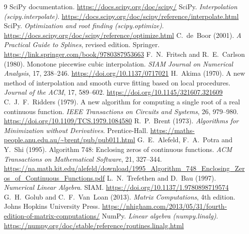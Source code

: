 \documentclass[11pt,a4paper]{article}
\begin{document}
\begin{thebibliography}{9}
   SciPy documentation. \url{https://docs.scipy.org/doc/scipy/}
   SciPy. \emph{Interpolation (scipy.interpolate)}.
    \url{https://docs.scipy.org/doc/scipy/reference/interpolate.html}
   SciPy. \emph{Optimization and root finding
    (scipy.optimize)}.
    \url{https://docs.scipy.org/doc/scipy/reference/optimize.html}
   C.~de~Boor (2001). \emph{A Practical Guide to Splines},
    revised edition. Springer.
    \url{https://link.springer.com/book/9780387953663}
   F.~N.~Fritsch and R.~E.~Carlson (1980). Monotone
    piecewise cubic interpolation. \emph{SIAM Journal on Numerical
    Analysis}, 17, 238--246. \url{https://doi.org/10.1137/0717021}
   H.~Akima (1970). A new method of interpolation and smooth
    curve fitting based on local procedures. \emph{Journal of the ACM}, 17,
    589--602. \url{https://doi.org/10.1145/321607.321609}
   C.~J.~F.~Ridders (1979). A new algorithm for computing a
    single root of a real continuous function. \emph{IEEE Transactions on
    Circuits and Systems}, 26, 979--980.
    \url{https://doi.org/10.1109/TCS.1979.1084580}
   R.~P.~Brent (1973). \emph{Algorithms for Minimization
    without Derivatives}. Prentice-Hall.
    \url{https://maths-people.anu.edu.au/~brent/pub/pub011.html}
   G.~E.~Alefeld, F.~A.~Potra and Y.~Shi (1995). Algorithm
    748: Enclosing zeros of continuous functions. \emph{ACM Transactions on
    Mathematical Software}, 21, 327--344.
    \url{https://na.math.kit.edu/alefeld/download/1995_Algorithm_748_Enclosing_Zeros_of_Continuous_Functions.pdf}
   L.~N.~Trefethen and D.~Bau (1997). \emph{Numerical
    Linear Algebra}. SIAM. \url{https://doi.org/10.1137/1.9780898719574}
   G.~H.~Golub and C.~F.~Van~Loan (2013). \emph{Matrix
    Computations}, 4th edition. Johns Hopkins University Press.
    \url{https://nhigham.com/2013/05/31/fourth-edition-of-matrix-computations/}
   NumPy. \emph{Linear algebra (numpy.linalg)}.
    \url{https://numpy.org/doc/stable/reference/routines.linalg.html}
\end{thebibliography}
\end{document}
